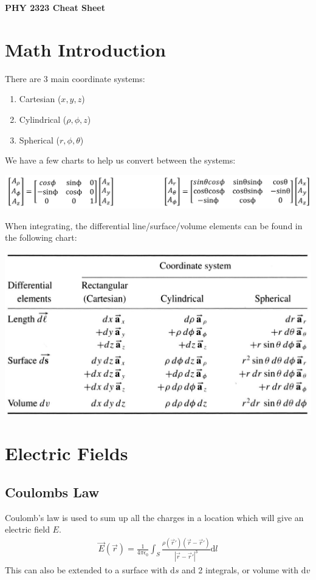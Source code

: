 \documentclass[12pt,letterpaper]{article} \usepackage{amsmath} \usepackage{graphicx} \usepackage[margin=1in]{geometry} \usepackage{longtable}  \usepackage{amssymb}
\begin{document}
	
	\begin{center}
		\Large\textbf{PHY 2323 Cheat Sheet} \\
		\vspace{0.5em}
	\end{center}
	
	\section{Math Introduction}
	There are 3 main coordinate systems:
	\begin{enumerate}[]
		\item Cartesian ($x,y,z$)
		\item Cylindrical ($\rho, \phi, z$)
		\item Spherical ($r,\phi, \theta$)
	\end{enumerate}

	We have a few charts to help us convert between the systems:
	\begin{center}
		\includegraphics[width=0.8\linewidth]{trans}
	\end{center}

	When integrating, the differential line/surface/volume elements can be found in the following chart:
	\begin{center}
		\includegraphics[width=0.7\linewidth]{differential_surfaces}
	\end{center}
	
	
	
	\section{Electric Fields}
	
	\subsection{Coulombs Law}
	Coulomb's law is used to sum up all the charges in a location which will give an electric field $E$.
	\begin{align*}
		\vec E (\vec r) = \frac{1}{4\pi \epsilon_0} \int_S \frac{\rho(\vec r\prime)(\vec r - \vec r\prime)}{|\vec r - \vec r\prime | ^3}\mathrm d l
	\end{align*}
	This can also be extended to a surface with $\mathrm ds$ and 2 integrals, or volume with $\mathrm dv$
	
\end{document}
